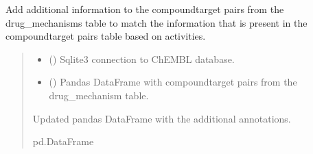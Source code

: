 \documentclass[letterpaper,10pt,english]{sphinxmanual}
\begin{document}
\begin{fulllineitems}
\label{\detokenize{get_drug_mechanism_ct_pairs:get_drug_mechanism_ct_pairs.add_annotations_to_drug_mechanisms_cti}}
\pysigstartsignatures
{}
\pysigstopsignatures
\sphinxAtStartPar
Add additional information to the compound\sphinxhyphen{}target pairs from the drug\_mechanisms table
to match the information that is present in the compound\sphinxhyphen{}target pairs table based on activities.
\begin{quote}\begin{description}
\begin{itemize}
\item {} 
\sphinxAtStartPar
{} () \textendash{} Sqlite3 connection to ChEMBL database.

\item {} 
\sphinxAtStartPar
{} () \textendash{} Pandas DataFrame with compound\sphinxhyphen{}target pairs
from the drug\_mechanism table.

\end{itemize}

\sphinxAtStartPar
Updated pandas DataFrame with the additional annotations.

\sphinxAtStartPar
pd.DataFrame

\end{description}\end{quote}

\end{fulllineitems}

\end{document}
